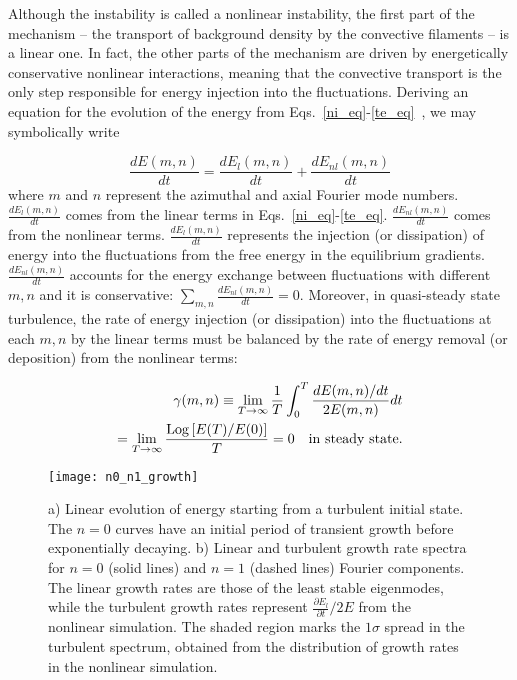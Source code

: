 \documentclass[letter,scriptaddress,twocolumn, prl,showkeys]{revtex4}
\def\beq{\begin{equation}}
\def\eeq{\end{equation}}
\def\beqar{\begin{eqnarray}}
\def\eeqar{\end{eqnarray}}
\newcommand{\diff}[2]{\frac{d#1}{d#2}}
\newcommand{\pdiff}[2]{\frac{\partial#1}{\partial#2}}
\begin{document}
Although the instability is called a nonlinear instability, the first part of the mechanism -- the transport of background density by the convective filaments -- is a linear one.
In fact, the other parts of the mechanism are driven by energetically conservative nonlinear interactions, 
meaning that the convective transport is the only step responsible for energy injection into the fluctuations.
Deriving an equation for the evolution of the energy from Eqs.~\ref{ni_eq}-\ref{te_eq}~\cite{friedman2012b,friedman2013}, we may symbolically write

\beq
\label{dEdt_def}
\diff{E(m,n)}{t} = \diff{E_{l}(m,n)}{t} + \diff{E_{nl}(m,n)}{t}
\eeq
where $m$ and $n$ represent the azimuthal and axial Fourier mode numbers. 
$\diff{E_{l}(m,n)}{t}$ comes from the linear terms in Eqs.~\ref{ni_eq}-\ref{te_eq}. $\diff{E_{nl}(m,n)}{t}$ comes from the nonlinear terms. 
$\diff{E_{l}(m,n)}{t}$ represents the injection (or dissipation) of energy into the fluctuations from the free energy in the equilibrium gradients.
$\diff{E_{nl}(m,n)}{t}$ accounts for the energy exchange between fluctuations with different $m,n$ and it is conservative: $\sum_{m,n} \diff{E_{nl}(m,n)}{t} = 0$.
Moreover, in quasi-steady state turbulence, the rate of energy injection (or dissipation) into the fluctuations at each $m,n$ by the linear terms must be balanced by
the rate of energy removal (or deposition) from the nonlinear terms:

\beqar
\label{steady_state}
\gamma(m,n) \equiv  \displaystyle\lim_{T \to \infty} \frac{1}{T} \int_0^T \frac{dE(m,n)/dt}{2 E(m,n)} dt \nonumber \\
= \displaystyle\lim_{T \to \infty} \frac{{\rm{Log}}\left[ E(T)/E(0) \right]}{T} = 0 \quad {\rm{in \ steady \ state}}.
\eeqar

\begin{figure}
\centerline{\texttt{[image: n0\_n1\_growth]}}
\caption{a) Linear evolution of energy starting from a turbulent initial state. The $n=0$ curves have an initial period of transient growth before exponentially decaying.
b) Linear and turbulent growth rate spectra for $n=0$ (solid lines) and $n=1$ (dashed lines) Fourier components. The linear growth rates are those of the least stable eigenmodes,
while the turbulent growth rates represent $\pdiff{E_l}{t}/2 E$ from the nonlinear simulation. The shaded region marks the $1 \sigma$ spread in the turbulent spectrum,
obtained from the distribution of growth rates in the nonlinear simulation.}
\label{n0_n1_growth}
\end{figure}
\end{document}
